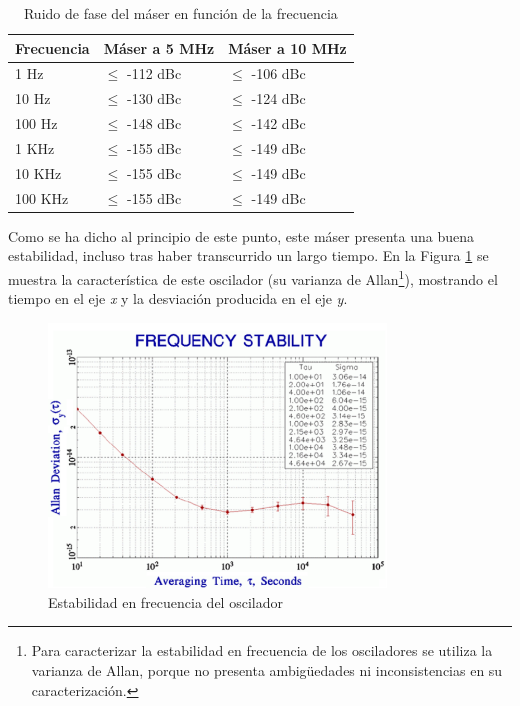 \begin{table}[htb]
\begin{center}
\begin{tabular}[t]{|l|l|l|}
\hline \hline
\rowcolor[RGB]{244, 184, 184} \textbf{Frecuencia} & \textbf{M\'aser a 5 MHz} & \textbf{M\'aser a 10 MHz}\\
\hline \hline
1 Hz & $\leq$ -112 dBc & $\leq$ -106 dBc\\
\hline
10 Hz & $\leq$ -130 dBc & $\leq$ -124 dBc\\
\hline 
100 Hz& $\leq$ -148 dBc & $\leq$ -142 dBc\\
\hline 
1 KHz& $\leq$ -155 dBc & $\leq$ -149 dBc\\
\hline 
10 KHz& $\leq$ -155 dBc & $\leq$ -149 dBc\\
\hline
100 KHz& $\leq$ -155 dBc & $\leq$ -149 dBc\\
\hline\hline
\end{tabular} 
\end{center}
\caption{Ruido de fase del m\'aser en funci\'on de la frecuencia}
\label{table:ruido_fase}
\end{table}


Como se ha dicho al principio de este punto, este m\'aser presenta una buena estabilidad, incluso tras haber transcurrido un largo tiempo. En la Figura \ref{fig:varianza_allan} se muestra la caracter\'istica de este oscilador (su varianza de Allan\footnote{Para caracterizar la estabilidad en frecuencia de los osciladores se utiliza la varianza de Allan, porque no presenta ambigüedades ni inconsistencias en su caracterizaci\'on. }), mostrando el tiempo en el eje \textit{x} y la desviaci\'on producida en el eje \textit{y}.

\begin{figure}
 \centering
 \includegraphics[width=0.8\textwidth]{./Utils/varianzaAllen.png}
 \caption{Estabilidad en frecuencia del oscilador}
 \label{fig:varianza_allan}
\end{figure}

